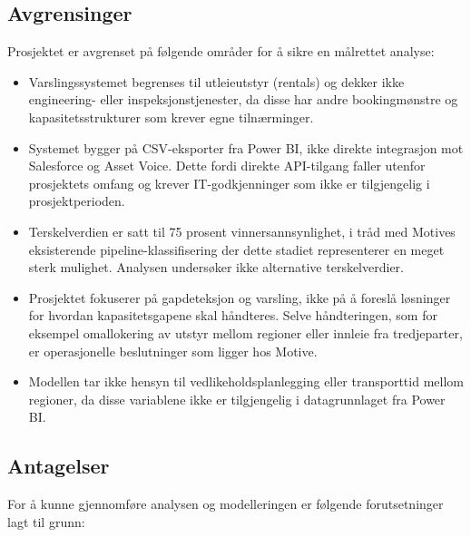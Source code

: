 \documentclass[a4paper,11pt]{article}
\begin{document}
\subsection{Avgrensinger}

Prosjektet er avgrenset på følgende områder for å sikre en målrettet analyse:

\begin{itemize}
\item Varslingssystemet begrenses til utleieutstyr (rentals) og dekker ikke engineering- eller inspeksjonstjenester, da disse har andre bookingmønstre og kapasitetsstrukturer som krever egne tilnærminger.  
\item Systemet bygger på CSV-eksporter fra Power BI, ikke direkte integrasjon mot Salesforce og Asset Voice. Dette fordi direkte API-tilgang faller utenfor prosjektets omfang og krever IT-godkjenninger som ikke er tilgjengelig i prosjektperioden.  
\item Terskelverdien er satt til 75 prosent vinnersannsynlighet, i tråd med Motives eksisterende pipeline-klassifisering der dette stadiet representerer en meget sterk mulighet. Analysen undersøker ikke alternative terskelverdier.  
\item Prosjektet fokuserer på gapdeteksjon og varsling, ikke på å foreslå løsninger for hvordan kapasitetsgapene skal håndteres. Selve håndteringen, som for eksempel omallokering av utstyr mellom regioner eller innleie fra tredjeparter, er operasjonelle beslutninger som ligger hos Motive.  
\item Modellen tar ikke hensyn til vedlikeholdsplanlegging eller transporttid mellom regioner, da disse variablene ikke er tilgjengelig i datagrunnlaget fra Power BI.
\end{itemize}

\subsection{Antagelser}

For å kunne gjennomføre analysen og modelleringen er følgende forutsetninger lagt til grunn:
\end{document}
